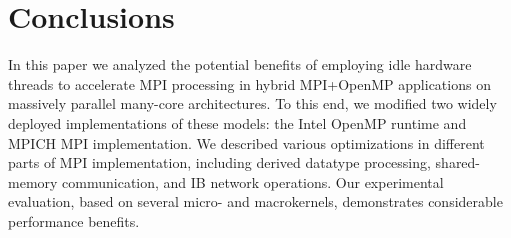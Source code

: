 \section{Conclusions}\label{sec:concl}

In this paper we analyzed the potential benefits of employing idle
hardware threads to accelerate MPI processing in hybrid MPI+OpenMP
applications on massively parallel many-core architectures.  To
this end, we modified two widely deployed
implementations of these models: the Intel OpenMP runtime and MPICH
MPI implementation. We described various optimizations in different
parts of MPI implementation, including derived datatype processing,
shared-memory communication, and IB network operations.  Our
experimental evaluation, based on several micro- and macrokernels,
demonstrates considerable performance benefits.
